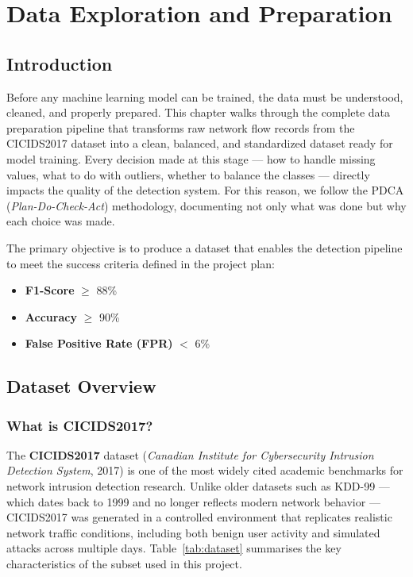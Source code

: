 \documentclass[12pt,a4paper]{report}
\begin{document}
\chapter{Data Exploration and Preparation}\label{ch:data_prep}

\section{Introduction}

Before any machine learning model can be trained, the data must be understood, cleaned, and properly prepared. This chapter walks through the complete data preparation pipeline that transforms raw network flow records from the CICIDS2017 dataset into a clean, balanced, and standardized dataset ready for model training. Every decision made at this stage --- how to handle missing values, what to do with outliers, whether to balance the classes --- directly impacts the quality of the detection system. For this reason, we follow the PDCA (\textit{Plan-Do-Check-Act}) methodology, documenting not only what was done but why each choice was made.

The primary objective is to produce a dataset that enables the detection pipeline to meet the success criteria defined in the project plan:
\begin{itemize}
    \item \textbf{F1-Score} $\geq$ 88\%
    \item \textbf{Accuracy} $\geq$ 90\%
    \item \textbf{False Positive Rate (FPR)} $<$ 6\%
\end{itemize}

\section{Dataset Overview}

\subsection{What is CICIDS2017?}

The \textbf{CICIDS2017} dataset (\textit{Canadian Institute for Cybersecurity Intrusion Detection System}, 2017) is one of the most widely cited academic benchmarks for network intrusion detection research. Unlike older datasets such as KDD-99 --- which dates back to 1999 and no longer reflects modern network behavior --- CICIDS2017 was generated in a controlled environment that replicates realistic network traffic conditions, including both benign user activity and simulated attacks across multiple days. Table~\ref{tab:dataset} summarises the key characteristics of the subset used in this project.
\end{document}
